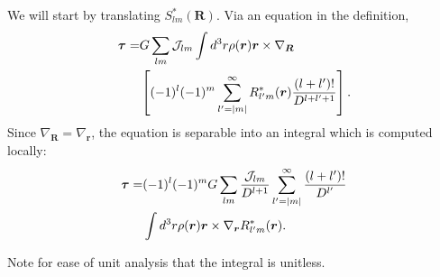 \documentclass[aps,twocolumn,secnumarabic,balancelastpage,amsmath,amssymb,nofootinbib,floatfix]{revtex4-1}
\begin{document}
We will start by translating $S^*_{lm}(\bm R)$. Via an equation in the definition,
\begin{equation*}
\begin{aligned}
\bm \tau = &G\sum_{lm}\mathcal{J}_{lm} \int d^3 r\rho(\bm r)\bm r \times \nabla_{\bm R}\\
&\left[ (-1)^l (-1)^m \sum_{l'=|m|}^\infty R_{l'm}^*(\bm r) \frac{(l+l')!}{D^{l+l'+1}} \right].
\end{aligned}
\end{equation*}
Since $\nabla_{\bm R}=\nabla_{\bm r}$, the equation is separable into an integral which is computed locally:
\begin{equation*}
\begin{aligned}
\bm \tau = &(-1)^l (-1)^m G\sum_{lm}  \frac{\mathcal{J}_{lm}}{D^{l+1}}\sum_{l'=|m|}^\infty \frac{(l+l')!}{D^{l'}}\\
& \int d^3 r\rho(\bm r)\bm r\times \nabla_{\bm r}R_{l'm}^*(\bm r).
\end{aligned}
\end{equation*}

Note for ease of unit analysis that the integral is unitless.
\end{document}
